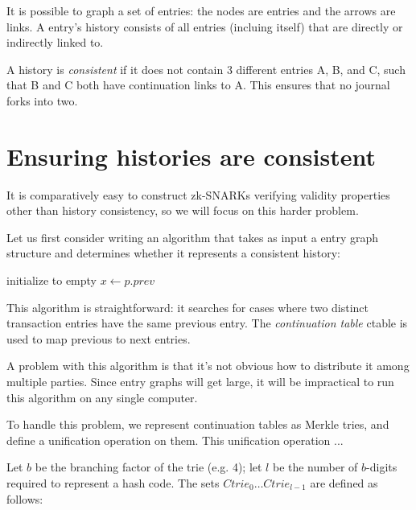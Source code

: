 \documentclass{article}
\begin{document}
It is possible to graph a set of entries: the nodes are entries and the arrows are links.  A entry's history consists of all entries (incluing itself) that are directly or indirectly linked to.

A history is \emph{consistent} if it does not contain 3 different entries A, B, and C, such that B and C both have continuation links to A.  This ensures that no journal forks into two.

\section{Ensuring histories are consistent}

It is comparatively easy to construct zk-SNARKs verifying validity properties other than history consistency, so we will focus on this harder problem.

Let us first consider writing an algorithm that takes as input a entry graph structure and determines whether it represents a consistent history:

\begin{algorithm}
  initialize \Ctable to empty\;
   {
     {
      $x \gets p.prev$ 
    }
  }
  \;
\end{algorithm}

This algorithm is straightforward: it searches for cases where two distinct transaction entries have the same previous entry.  The \emph{continuation table} \textsf{ctable} is used to map previous to next entries.

A problem with this algorithm is that it's not obvious how to distribute it among multiple parties.  Since entry graphs will get large, it will be impractical to run this algorithm on any single computer.

To handle this problem, we represent continuation tables as Merkle tries, and define a unification operation on them.  This unification operation ...

Let $b$ be the branching factor of the trie (e.g. 4); let $l$ be the number of $b$-digits required to represent a hash code.  The sets $Ctrie_0 \ldots Ctrie_{l-1}$ are defined as follows:
\end{document}
